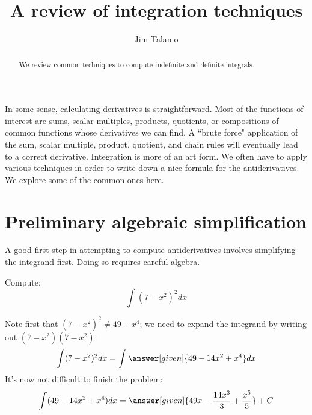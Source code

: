\documentclass[nooutcomes]{ximera}
\author{Jim Talamo}
\title[Dig-In:]{A review of integration techniques}
\begin{document}
\begin{abstract}
  We review common techniques to compute indefinite and definite integrals.
\end{abstract}
\maketitle

In some sense, calculating derivatives is straightforward.  Most of the functions of interest are sums, scalar multiples, products, quotients, or compositions of common functions whose derivatives we can find.  A ``brute force" application of the sum, scalar multiple, product, quotient, and chain rules will eventually lead to a correct derivative.  Integration is more of an art form.  We often have to apply various techniques in order to write down a nice formula for the antiderivatives. We explore some of the common ones here.

\section{Preliminary algebraic simplification}


A good first step in attempting to compute antiderivatives involves simplifying the integrand first.  Doing so requires careful algebra.
\begin{example}
  Compute:
  \[
  \int (7-x^2)^2 dx
  \]
  \begin{explanation}
   Note first that $(7-x^2)^2 \neq 49-x^4$; we need to expand the integrand by writing out $(7-x^2)(7-x^2)$:
    \[
    \int (7-x^2)^2 dx  = \int \answer[given]{49 - 14x^2 + x^4} dx
    \]
    It's now not difficult to finish the problem:
    \[
    \int (49 - 14x^2 + x^4) dx = \answer[given]{49x - \frac{14 x^3}{3} + \frac{x^5}{5}} + C
    \]
  \end{explanation}
\end{example}




%
%
%
\end{document}
